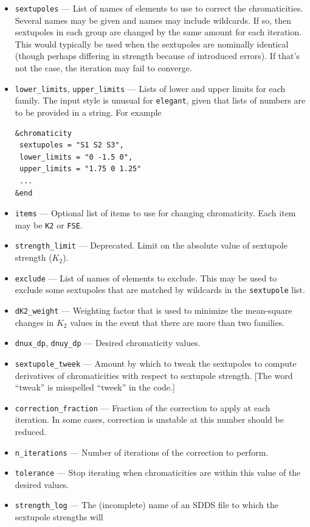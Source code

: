 \documentclass[11pt]{article}
\begin{document}
\begin{itemize}
\item \verb|sextupoles| --- List of names of elements to use to correct the chromaticities.  Several names may be given and names may include
  wildcards. If so, then sextupoles in each group are changed by the same amount for each iteration.
  This would typically be used when the sextupoles are nominally identical (though perhaps differing in strength because of
  introduced errors). If that's not the case, the iteration may fail to converge.
\item \verb|lower_limits|, \verb|upper_limits| --- Lists of lower and upper limits for each family. The input style is
  unusual for {\tt elegant}, given that lists of numbers are to be provided in a string. For example
\begin{verbatim}
&chromaticity
 sextupoles = "S1 S2 S3",
 lower_limits = "0 -1.5 0",
 upper_limits = "1.75 0 1.25"
 ...
&end
\end{verbatim}
\item \verb|items| --- Optional list of items to use for changing chromaticity. Each item may be \verb|K2| or \verb|FSE|.
\item \verb|strength_limit| --- Deprecated. Limit on the absolute value of sextupole strength ($K_2$).
\item \verb|exclude| --- List of names of elements to exclude. This may be used to exclude some sextupoles that are matched by wildcards in
  the \verb|sextupole| list.
\item \verb|dK2_weight| --- Weighting factor that is used to minimize the mean-square changes in $K_2$ values in the
  event that there are more than two families.
\item \verb|dnux_dp|, \verb|dnuy_dp| --- Desired chromaticity values.
\item \verb|sextupole_tweek| --- Amount by which to tweak the sextupoles to compute derivatives of
chromaticities with respect to sextupole strength.  [The word ``tweak'' is misspelled ``tweek'' in the code.]
\item \verb|correction_fraction| --- Fraction of the correction to apply at each iteration.  In some
cases, correction is unstable at this number should be reduced.
\item \verb|n_iterations| --- Number of iterations of the correction to perform.
\item \verb|tolerance| --- Stop iterating when chromaticities are within this value of the
desired values.
\item \verb|strength_log| --- The (incomplete) name of an SDDS file to which the sextupole strengths will

\end{itemize}
\end{document}
